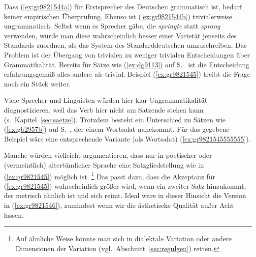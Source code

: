 Dass (\ref{ex:gr9821544a}) für Erstsprecher des Deutschen grammatisch ist, bedarf keiner empirischen Überprüfung.
Ebenso ist (\ref{ex:gr9821544b}) trivialerweise ungrammatisch.
Selbst wenn es Sprecher gäbe, die \textit{springte} statt \textit{sprang} verwenden, würde man diese wahrscheinlich besser einer Varietät jenseits des Standards zuordnen, als das System des Standarddeutschen umzuschreiben.
Das Problem ist der Übergang von trivialen zu weniger trivialen Entscheidungen über Grammatikalität.
Bereits für Sätze wie (\ref{ex:dg9113}) auf S.~\pageref{ex:dg9113} ist die Entscheidung erfahrungsgemäß alles andere als trivial.
Beispiel (\ref{ex:gr9821545}) treibt die Frage noch ein Stück weiter.

\begin{exe}
\end{exe}

Viele Sprecher und Linguisten würden hier klar Ungrammatikalität diagnostizieren, weil das Verb hier nicht am Satzende stehen kann (s.\ Kapitel~\ref{sec:saetze}).
Trotzdem besteht ein Unterschied zu Sätzen wie (\ref{ex:gb2957b}) auf S.~\pageref{ex:gb2957b}, der einem Wortsalat nahekommt.
Für das gegebene Beispiel wäre eine entsprechende Variante (als Wortsalat) \zB (\ref{ex:gr9821545555555}).

\begin{exe}
\end{exe}

Manche würden vielleicht argumentieren, dass nur in poetischer oder (vermeintlich) altertümlicher Sprache eine Satzgliedstellung wie in (\ref{ex:gr9821545}) möglich ist.%
\footnote{Auf ähnliche Weise könnte man sich in dialektale Variation oder andere Dimensionen der Variation (vgl.\ Abschnitt~\ref{sec:regulgen}) retten.}
Das passt dazu, dass die Akzeptanz für (\ref{ex:gr9821545}) wahrscheinlich größer wird, wenn ein zweiter Satz hinzukommt, der metrisch ähnlich ist und sich reimt.
Ideal wäre in dieser Hinsicht die Version in (\ref{ex:gr9821546}), zumindest wenn wir die ästhetische Qualität außer Acht lassen.

\begin{exe}
\end{exe}

